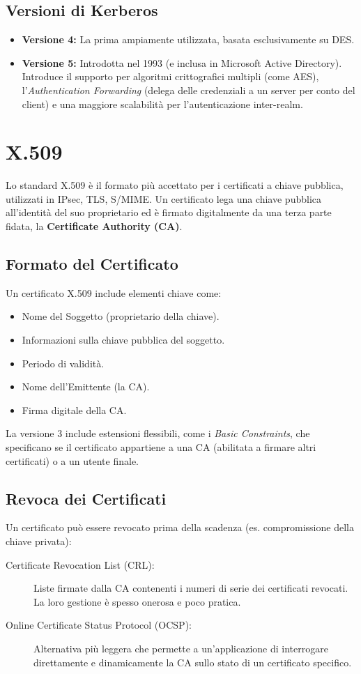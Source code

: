 \subsection{Versioni di Kerberos}
\begin{itemize}
    \item \textbf{Versione 4:} La prima ampiamente utilizzata, basata esclusivamente su DES.
    \item \textbf{Versione 5:} Introdotta nel 1993 (e inclusa in Microsoft Active Directory). Introduce il supporto per algoritmi crittografici multipli (come AES), l'\textit{Authentication Forwarding} (delega delle credenziali a un server per conto del client) e una maggiore scalabilità per l'autenticazione inter-realm.
\end{itemize}

\section{X.509}

Lo standard X.509 è il formato più accettato per i certificati a chiave pubblica, utilizzati in IPsec, TLS, S/MIME. Un certificato lega una chiave pubblica all'identità del suo proprietario ed è firmato digitalmente da una terza parte fidata, la \textbf{Certificate Authority (CA)}.



\subsection{Formato del Certificato}
Un certificato X.509 include elementi chiave come:
\begin{itemize}
    \item Nome del Soggetto (proprietario della chiave).
    \item Informazioni sulla chiave pubblica del soggetto.
    \item Periodo di validità.
    \item Nome dell'Emittente (la CA).
    \item Firma digitale della CA.
\end{itemize}
La versione 3 include estensioni flessibili, come i \textit{Basic Constraints}, che specificano se il certificato appartiene a una CA (abilitata a firmare altri certificati) o a un utente finale.

\subsection{Revoca dei Certificati}
Un certificato può essere revocato prima della scadenza (es. compromissione della chiave privata):
\begin{description}
    \item[Certificate Revocation List (CRL):] Liste firmate dalla CA contenenti i numeri di serie dei certificati revocati. La loro gestione è spesso onerosa e poco pratica.
    \item[Online Certificate Status Protocol (OCSP):] Alternativa più leggera che permette a un'applicazione di interrogare direttamente e dinamicamente la CA sullo stato di un certificato specifico.
\end{description}

